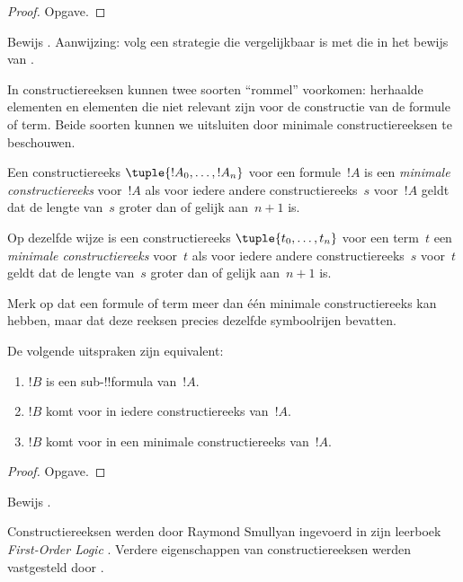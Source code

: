 \documentclass[../../../include/open-logic-section]{subfiles}
\begin{document}
\begin{proof}
Opgave.
\end{proof}

\begin{prob}
Bewijs .
Aanwijzing: volg een strategie die vergelijkbaar is met die in het
bewijs van .
\end{prob}

In constructiereeksen kunnen twee soorten ``rommel'' voorkomen:
herhaalde elementen en elementen die niet relevant zijn voor de
constructie van de formule of term. Beide soorten kunnen we uitsluiten
door minimale constructiereeksen te beschouwen.

\begin{defn}
Een constructiereeks $\tuple{!A_0, \ldots, !A_n}$ voor een
formule~$!A$ is een \emph{minimale constructiereeks} voor~$!A$
als voor iedere andere constructiereeks~$s$ voor~$!A$ geldt dat de
lengte van~$s$ groter dan of gelijk aan~$n+1$ is.

Op dezelfde wijze is een constructiereeks $\tuple{t_0, \ldots, t_n}$
voor een term~$t$ een \emph{minimale constructiereeks}
voor~$t$ als voor iedere andere constructiereeks~$s$ voor~$t$ geldt dat
de lengte van~$s$ groter dan of gelijk aan~$n+1$ is.
\end{defn}

Merk op dat een formule of term meer dan één minimale
constructiereeks kan hebben, maar dat deze reeksen precies dezelfde
symboolrijen bevatten.

\begin{prop}
De volgende uitspraken zijn equivalent:
\begin{enumerate}
    \item $!B$ is een sub-!!{formula} van~$!A$.
    \item $!B$ komt voor in iedere constructiereeks van~$!A$.
    \item $!B$ komt voor in een minimale constructiereeks van~$!A$.
\end{enumerate}
\end{prop}

\begin{proof}
Opgave.
\end{proof}

\begin{prob}
Bewijs .
\end{prob}

\begin{history}
Constructiereeksen werden door Raymond Smullyan ingevoerd in zijn
leerboek \emph{First-Order Logic} \citep{Smullyan1968}.
Verdere eigenschappen van constructiereeksen werden vastgesteld door
\citet{Zuckerman1973}.
\end{history}
\end{document}
